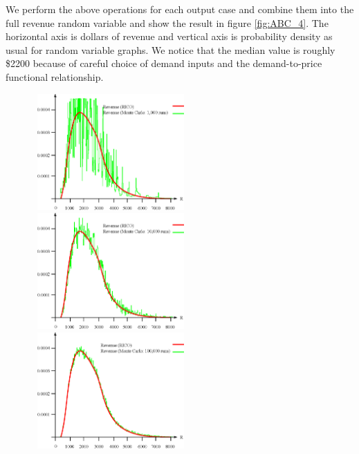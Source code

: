 We perform the above operations for each output case and combine them
into the full revenue random variable and show the result in figure
\ref{fig:ABC_4}. The horizontal axis is dollars of revenue and vertical
axis is probability density as usual for random variable graphs. We
notice that the median value is roughly \$2200 because of careful
choice of demand inputs and the demand-to-price functional
relationship. 


\begin{figure}[ht]
\begin{minipage}[b]{0.5\linewidth}
\centering
\includegraphics[width=2.33in, height=1.75in]{Images/ABC_1K}
\end{minipage}
\begin{minipage}[b]{0.5\linewidth}
\centering
\includegraphics[width=2.33in, height=1.75in]{Images/ABC_10K}
\end{minipage}
\begin{minipage}[b]{0.5\linewidth}
\centering
\includegraphics[width=2.33in, height=1.75in]{Images/ABC_100K}
\end{minipage}
\begin{minipage}[b]{0.5\linewidth}

\end{minipage}
\end{figure}
